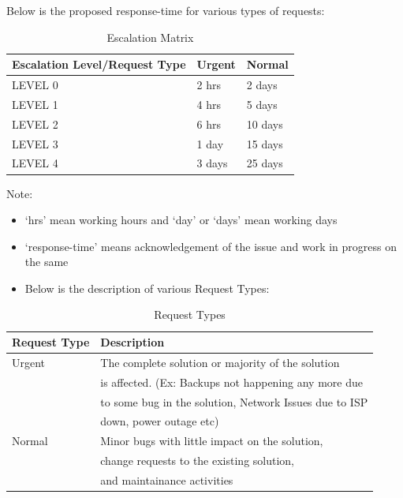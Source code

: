 \documentclass[11pt]{article}
\begin{document}
 Below is the proposed response-time for various types of requests:


\begin{table}[H]
\caption{\label{tbl: Escalation Matrix}Escalation Matrix}
\begin{center}
\begin{tabular}{lll}
\hline
 Escalation Level/Request Type  &  Urgent  &  Normal   \\
\hline
 LEVEL 0                        &  2 hrs   &  2 days   \\
 LEVEL 1                        &  4 hrs   &  5 days   \\
 LEVEL 2                        &  6 hrs   &  10 days  \\
 LEVEL 3                        &  1 day   &  15 days  \\
 LEVEL 4                        &  3 days  &  25 days  \\
\hline
\end{tabular}
\end{center}
\end{table}


Note: 
\begin{itemize}
\item `hrs' mean working hours and `day' or `days' mean working days
\item `response-time' means acknowledgement of the issue and work in progress on the same
\end{itemize}
 
\begin{itemize}
\item Below is the description of various Request Types:
\end{itemize}
\begin{table}[H]
\caption{\label{tbl:Request Types}Request Types}
\begin{center}
\begin{tabular}{ll}
\hline
 Request Type  &  Description                                             \\
\hline
 Urgent        &  The complete solution or majority of the solution       \\
               &  is affected. (Ex: Backups not happening any more due    \\
               &  to some bug in the solution, Network Issues due to ISP  \\
               &  down, power outage etc)                                 \\
 Normal        &  Minor bugs with little impact on the solution,          \\
               &  change requests to the existing solution,               \\
               &  and maintainance activities                             \\
\hline
\end{tabular}
\end{center}
\end{table}
\end{document}
